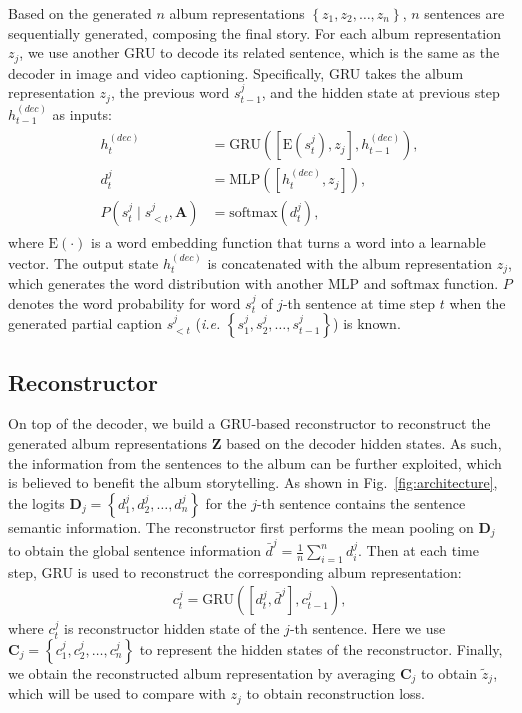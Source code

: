 \documentclass[letterpaper]{article} \usepackage{aaai19}  \usepackage{times}  \usepackage{helvet}  \usepackage{courier}  \usepackage{url}  \usepackage{graphicx}  \usepackage{color}
\begin{document}
Based on the generated $n$ album representations $\left\{z_1,z_2,\dots,z_n\right\}$,  $n$ sentences are sequentially generated, composing the final story.
For each album representation $z_j$, we use another GRU to decode its related sentence, which is the same as the decoder in image and video captioning. Specifically, GRU takes the album representation $z_j$, the previous word $s_{t-1}^j$, and the hidden state at previous step $h_{t-1}^{(dec)}$ as inputs:
\begin{align}
	\label{eq:decoder_1}
    \begin{split}
h_t^{(dec)} &= \text{GRU}\left(\left[\text{E}(s_t^j), z_j\right], h_{t-1}^{(dec)}\right), \\
        d_t^j &= \text{MLP}\left(\left[h_t^{(dec)}, z_j\right]\right), \\
   		P\left(s_t^j \mid s_{<t}^j, \mathbf{A}\right) &= \text{softmax}\left(d_t^j\right),
    \end{split}
\end{align}
where $\text{E}(\cdot)$ is a word embedding function that turns a word into a learnable vector.
The output state $h_t^{(dec)}$ is concatenated with the album representation $z_j$, which generates the word distribution with another $\text{MLP}$ and $\text{softmax}$ function. $P$ denotes the word probability for word $s_t^j$ of $j$-th sentence at time step $t$ when the generated partial caption $s_{<t}^j$ (\textit{i.e.} $\left\{s_1^j, s_2^j,\dots, s_{t-1}^j \right\}$) is known.






\subsection{Reconstructor}
On top of the decoder, we build a GRU-based reconstructor to reconstruct the generated album representations $\mathbf{Z}$ based on the decoder hidden states.
As such, the information from the sentences to the album can be further exploited, which is believed to benefit the album storytelling.
As shown in Fig.~\ref{fig:architecture},
the logits $\mathbf{D}_j=\left\{d_1^j, d_2^j, \dots, d_n^j \right\}$ for the $j$-th sentence contains the sentence semantic information. The reconstructor first performs the mean pooling on $\mathbf{D}_j$ to obtain the global sentence information $\bar{d}^j=\frac{1}{n}\sum_{i=1}^{n}d_i^j$. Then at each time step, GRU is used to reconstruct the corresponding album representation:
\begin{align}
\label{eq:recons_2}
c_t^j = \text{GRU}\left(\left[d_t^j, \bar{d}^j\right], c_{t-1}^j\right),
\end{align}
where $c_t^j$ is reconstructor hidden state of the $j$-th sentence.
Here we use $\mathbf{C}_j = \left\{c_1^j, c_2^j, \dots, c_n^j\right\}$ to represent the hidden states of the reconstructor. Finally, we obtain the reconstructed album representation by averaging $\mathbf{C}_j$ to obtain $\tilde{z}_j$, which will be used to
compare with ${z}_j$ to obtain reconstruction loss.
\end{document}

